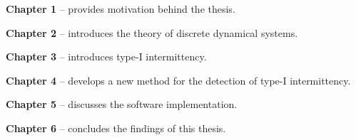 \begin{description}
	\item \textbf{Chapter 1} -- provides motivation behind the thesis.
	\item \textbf{Chapter 2} -- introduces the theory of discrete dynamical systems.
	\item \textbf{Chapter 3} -- introduces type-I intermittency.
	\item \textbf{Chapter 4} -- develops a new method for the detection of type-I intermittency.
	\item \textbf{Chapter 5} -- discusses the software implementation.
	\item \textbf{Chapter 6} -- concludes the findings of this thesis.
\end{description}

\endinput